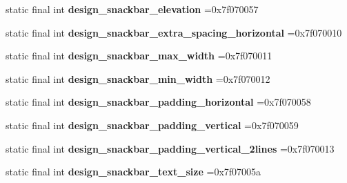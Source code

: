 \begin{DoxyCompactItemize}
\item 
\hypertarget{classcheck_1_1test_1_1_r_1_1dimen_aca8c8f6ed19fb29122aafaaaac10a56c}{}static final int {\bfseries design\+\_\+snackbar\+\_\+elevation} =0x7f070057\label{classcheck_1_1test_1_1_r_1_1dimen_aca8c8f6ed19fb29122aafaaaac10a56c}

\item 
\hypertarget{classcheck_1_1test_1_1_r_1_1dimen_a8172d6e1883787c31e9409e399336a09}{}static final int {\bfseries design\+\_\+snackbar\+\_\+extra\+\_\+spacing\+\_\+horizontal} =0x7f070010\label{classcheck_1_1test_1_1_r_1_1dimen_a8172d6e1883787c31e9409e399336a09}

\item 
\hypertarget{classcheck_1_1test_1_1_r_1_1dimen_ad415672c33df16e7737627d05273f1f5}{}static final int {\bfseries design\+\_\+snackbar\+\_\+max\+\_\+width} =0x7f070011\label{classcheck_1_1test_1_1_r_1_1dimen_ad415672c33df16e7737627d05273f1f5}

\item 
\hypertarget{classcheck_1_1test_1_1_r_1_1dimen_a97b48bd37e932ed8e2552ba2736a0fa3}{}static final int {\bfseries design\+\_\+snackbar\+\_\+min\+\_\+width} =0x7f070012\label{classcheck_1_1test_1_1_r_1_1dimen_a97b48bd37e932ed8e2552ba2736a0fa3}

\item 
\hypertarget{classcheck_1_1test_1_1_r_1_1dimen_a384c8219fbc5195df1a194bd71271e22}{}static final int {\bfseries design\+\_\+snackbar\+\_\+padding\+\_\+horizontal} =0x7f070058\label{classcheck_1_1test_1_1_r_1_1dimen_a384c8219fbc5195df1a194bd71271e22}

\item 
\hypertarget{classcheck_1_1test_1_1_r_1_1dimen_a10f6d79944762778106d377d4c887550}{}static final int {\bfseries design\+\_\+snackbar\+\_\+padding\+\_\+vertical} =0x7f070059\label{classcheck_1_1test_1_1_r_1_1dimen_a10f6d79944762778106d377d4c887550}

\item 
\hypertarget{classcheck_1_1test_1_1_r_1_1dimen_a5ad8b168225cc01eba5657b9021a9b63}{}static final int {\bfseries design\+\_\+snackbar\+\_\+padding\+\_\+vertical\+\_\+2lines} =0x7f070013\label{classcheck_1_1test_1_1_r_1_1dimen_a5ad8b168225cc01eba5657b9021a9b63}

\item 
\hypertarget{classcheck_1_1test_1_1_r_1_1dimen_abb10957bb28d137665ce8addd540547c}{}static final int {\bfseries design\+\_\+snackbar\+\_\+text\+\_\+size} =0x7f07005a\label{classcheck_1_1test_1_1_r_1_1dimen_abb10957bb28d137665ce8addd540547c}


\end{DoxyCompactItemize}
